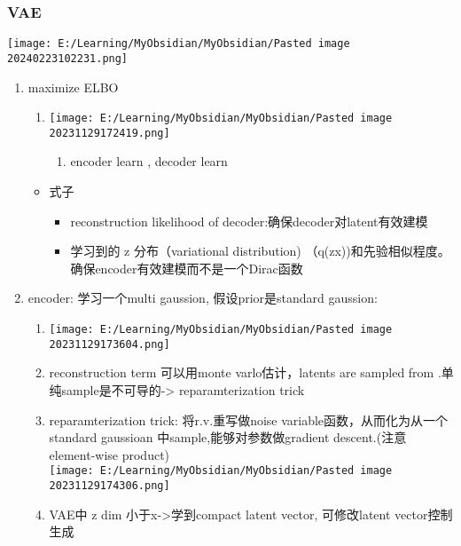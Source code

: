 \documentclass[
]{article}
\providecommand{\tightlist}{%
  \setlength{\itemsep}{0pt}\setlength{\parskip}{0pt}}
\begin{document}
\subsubsection{VAE}\label{vae}

\texttt{[image: E:/Learning/MyObsidian/MyObsidian/Pasted image 20240223102231.png]}

\begin{enumerate}
\tightlist
\item
  maximize ELBO

  \begin{enumerate}
  \tightlist
  \item
    \texttt{[image: E:/Learning/MyObsidian/MyObsidian/Pasted image 20231129172419.png]}

    \begin{enumerate}
    \tightlist
    \item
      encoder learn {}, decoder learn {}
    \end{enumerate}
  \end{enumerate}

  \begin{itemize}
  \tightlist
  \item
    式子

    \begin{itemize}
    \tightlist
    \item
      reconstruction likelihood of decoder:确保decoder对latent有效建模
    \item
      学习到的 z 分布（variational distribution)
      （q(z\textbar x))和先验相似程度。确保encoder有效建模而不是一个Dirac函数
    \end{itemize}
  \end{itemize}
\item
  encoder: 学习一个multi gaussion, 假设prior是standard gaussion:

  \begin{enumerate}
  \tightlist
  \item
    \texttt{[image: E:/Learning/MyObsidian/MyObsidian/Pasted image 20231129173604.png]}
  \item
    reconstruction term 可以用monte varlo估计，latents {} are sampled
    from {} .单纯sample是不可导的-\textgreater{} reparamterization trick
  \item
    reparamterization trick: 将r.v.重写做noise
    variable函数，从而化为从一个standard gaussioan
    中sample,能够对参数做gradient descent.(注意 {} element-wise
    product)\\
    \texttt{[image: E:/Learning/MyObsidian/MyObsidian/Pasted image 20231129174306.png]}
  \item
    VAE中 z dim 小于x-\textgreater 学到compact latent vector,
    可修改latent vector控制生成
  \end{enumerate}
\end{enumerate}
\end{document}
